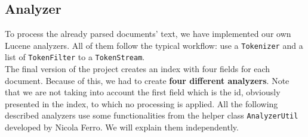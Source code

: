 \subsection{Analyzer}\label{subsec:analyzer}

To process the already parsed documents' text, we have implemented our own Lucene analyzers.
All of them follow the typical workflow: use a \texttt{Tokenizer} and a list of \texttt{TokenFilter} to a
\texttt{TokenStream}.\\

The final version of the project creates an index with four fields for each document.
Because of this, we had to create \textbf{four different analyzers}.
Note that we are not taking into account the first field which is the id, obviously presented in the index, to which no
processing is applied.
All the following described analyzers use some functionalities from the helper class \texttt{AnalyzerUtil} developed by
Nicola Ferro.
We will explain them independently.\\

